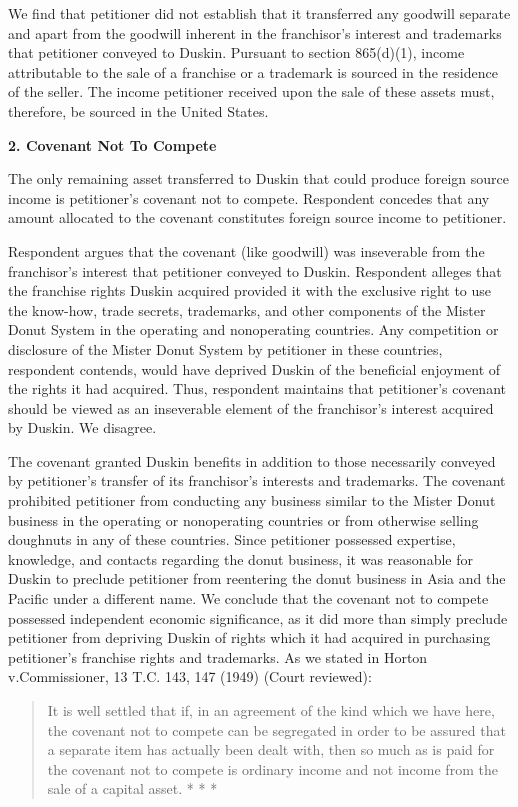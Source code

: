 \begin{select}
We find that petitioner did not establish that it transferred any goodwill separate and apart from the goodwill inherent
in the franchisor's interest and trademarks that petitioner conveyed to Duskin. Pursuant to section 865(d)(1), income
attributable to the sale of a franchise or a trademark is sourced in the residence of the seller. The income petitioner received
upon the sale of these assets must, therefore, be sourced in the United States.

\begin{center} \textbf{2. Covenant Not To Compete}
\end{center}
The only remaining asset transferred to Duskin that could produce foreign source income is petitioner's covenant
not to compete. Respondent concedes that any amount allocated to the covenant constitutes foreign source income to
petitioner.

Respondent argues that the covenant (like goodwill) was inseverable from the franchisor's interest that petitioner
conveyed to Duskin. Respondent alleges that the franchise rights Duskin acquired provided it with the exclusive
right to use the know-how, trade secrets, trademarks, and other components of the Mister Donut System in the operating
and nonoperating countries. Any competition or disclosure of the Mister Donut System by petitioner in these countries,
respondent contends, would have deprived Duskin of the beneficial enjoyment of the rights it had acquired. Thus,
respondent maintains that petitioner's covenant should be viewed as an inseverable element of the franchisor's
interest acquired by Duskin. We disagree.

The covenant granted Duskin benefits in addition to those necessarily conveyed by petitioner's transfer of its
franchisor's interests and trademarks. The covenant prohibited petitioner from conducting any business similar to the
Mister Donut business in the operating or nonoperating countries or from otherwise selling doughnuts in any of these
countries. Since petitioner possessed expertise, knowledge, and contacts regarding the donut business, it was reasonable
for Duskin to preclude petitioner from reentering the donut business in Asia and the Pacific under a different name. We
conclude that the covenant not to compete possessed independent economic significance, as it did more than
simply preclude petitioner from depriving Duskin of rights which it had acquired in purchasing petitioner's franchise
rights and trademarks. As we stated in Horton v.\@ Commissioner, 13 T.C. 143, 147 (1949) (Court reviewed):
\begin{quote}It is well settled that if, in an agreement of the kind which we have here, the covenant not to compete can
be segregated in order to be assured that a separate item has actually been dealt with, then so much as is paid
for the covenant not to compete is ordinary income and not income from the sale of a capital asset. * * *
\end{quote}


\end{select}
